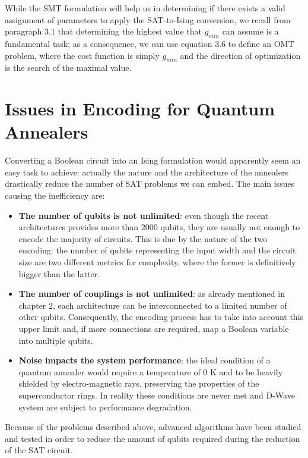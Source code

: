While the SMT formulation will help us in determining if there exists a valid assignment of parameters to apply the SAT-to-Ising conversion, we recall from paragraph 3.1 that determining the highest value that $g_{min}$ can assume is a fundamental task; as a consequence, we can use equation 3.6 to define an OMT problem, where the cost function is simply $g_{min}$ and the direction of optimization is the search of the maximal value.

\section{Issues in Encoding for Quantum Annealers}

Converting a Boolean circuit into an Ising formulation would apparently seem an easy task to achieve: actually the nature and the architecture of the annealers drastically reduce the number of SAT problems we can embed. The main issues causing the inefficiency are:

\begin{itemize}
    \item \textbf{The number of qubits is not unlimited}: even though the recent architectures provides more than 2000 qubits, they are usually not enough to encode the majority of circuits.
    This is due by the nature of the two encoding: the number of qubits representing the input width and the circuit size are two different metrics for complexity, where the former is definitively bigger than the latter. 
    \item \textbf{The number of couplings is not unlimited}: as already mentioned in chapter 2, each architecture can be interconnected to a limited number of other qubits. Consequently, the encoding process has to take into account this upper limit and, if more connections are required, map a Boolean variable into multiple qubits.
    \item \textbf{Noise impacts the system performance}: the ideal condition of a quantum annealer would require a temperature of 0 K and to be heavily shielded by electro-magnetic rays, preserving the properties of the superconductor rings. In reality these conditions are never met and D-Wave system are subject to performance degradation.
\end{itemize}

Because of the problems described above, advanced algorithms have been studied and tested in order to reduce the amount of qubits required during the reduction of the SAT circuit.

